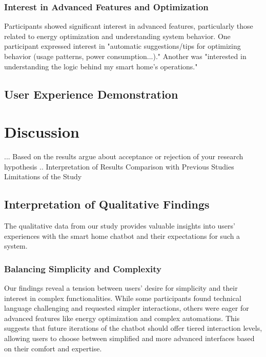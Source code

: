 \subsubsection{Interest in Advanced Features and Optimization}
Participants showed significant interest in advanced features, particularly those related to energy optimization and understanding system behavior. One participant expressed interest in "automatic suggestions/tips for optimizing behavior (usage patterns, power consumption...)." Another was "interested in understanding the logic behind my smart home's operations."

\subsection{User Experience Demonstration}

\section{Discussion}


... Based on the results argue about acceptance or rejection of your research hypothesis   .. 
Interpretation of Results
Comparison with Previous Studies
Limitations of the Study

\subsection{Interpretation of Qualitative Findings}
The qualitative data from our study provides valuable insights into users' experiences with the smart home chatbot and their expectations for such a system.
\subsubsection{Balancing Simplicity and Complexity}
Our findings reveal a tension between users' desire for simplicity and their interest in complex functionalities. While some participants found technical language challenging and requested simpler interactions, others were eager for advanced features like energy optimization and complex automations. This suggests that future iterations of the chatbot should offer tiered interaction levels, allowing users to choose between simplified and more advanced interfaces based on their comfort and expertise.
